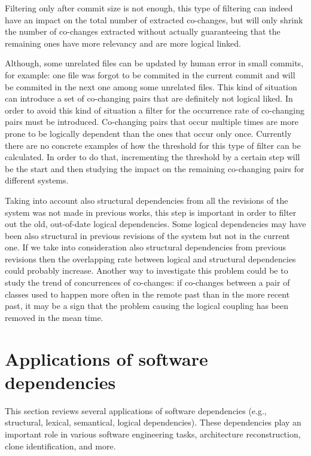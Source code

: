 Filtering only after commit size is not enough, this type of filtering can indeed have an impact on the total number of extracted co-changes, but will only shrink the number of co-changes extracted without actually guaranteeing that the remaining ones have more relevancy and are more logical linked.

Although, some unrelated files can be updated by human error in small commits, for example: one file was forgot to be commited in the current commit and will be commited in the next one among some unrelated files. This kind of situation can introduce a set of co-changing pairs that are definitely not logical liked. In order to avoid this kind of situation a filter for the occurrence rate of co-changing pairs must be introduced. Co-changing pairs that occur multiple times are more prone to be logically dependent than the ones that occur only once. Currently there are no concrete examples of how the threshold for this type of filter can be calculated. In order to do that, incrementing the threshold by a certain step will be the start and then studying the impact on the remaining co-changing pairs for different systems. 

Taking into account also structural dependencies from all the revisions of the system was not made in previous works, this step is important in order to filter out the old, out-of-date logical dependencies. Some logical dependencies may have been also structural in previous revisions of the system but not in the current one. If we take into consideration also structural dependencies from previous revisions then the overlapping rate between logical and structural dependencies could probably increase. Another way to investigate this problem could be to study the trend of concurrences of co-changes: if co-changes between a pair of classes used to happen more often in the remote past than in the more recent past, it may be a sign that the problem causing the logical coupling has been removed in the mean time. 




\section{Applications of software dependencies}
\label{app}

\hspace{4em}This section reviews several applications of software dependencies (e.g., structural, lexical, semantical, logical dependencies). These dependencies play an important role in various software engineering tasks, architecture reconstruction, clone identification, and more. 


